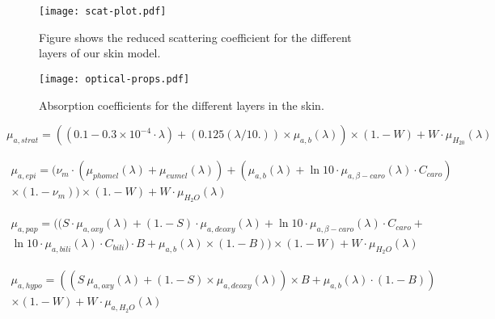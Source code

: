 \begin{figure}[!htpb]
	\centering
	\texttt{[image: scat-plot.pdf]}
	\caption{Figure shows the reduced scattering coefficient for the different layers of our skin model.}
	\label{fig:scatplot}
\end{figure}



\begin{figure}[!htpb]
  \centering
  \texttt{[image: optical-props.pdf]}
  \caption{Absorption coefficients for the different layers in the skin.}
  \label{fig:absoplayers}
\end{figure}


\begin{equation}
\mu_{a,strat}= ((0.1 - 0.3\times10^{-4}\cdot\lambda) + (0.125(\lambda/10.))\times \mu_{a,b}(\lambda))\times(1. - W) + W\cdot\mu_{H_20}(\lambda)
\label{eqn:stratabs}
\end{equation}

\begin{equation}
\begin{split}
\mu_{a,epi}= (\nu_m \cdot (\mu_{phomel}(\lambda) + \mu_{eumel}(\lambda)) + (\mu_{a,b}(\lambda) + \ln10 \cdot \mu_{a,\beta-caro}(\lambda) \cdot C_{caro}) \\ \times (1. - \nu_m)) \times(1. - W) + W \cdot \mu_{H_2O}(\lambda)
\end{split}
\label{eqn:epiabs}
\end{equation}

\begin{equation}
\begin{split}
\mu_{a,pap}=((S \cdot \mu_{a,oxy}(\lambda) + (1. - S) \cdot \mu_{a,deoxy}(\lambda) + \ln10 \cdot \mu_{a,\beta-caro}(\lambda) \cdot C_{caro} + \\ \ln10 \cdot \mu_{a,bili}(\lambda)\cdot C_{bili})\cdot B + \mu_{a,b}(\lambda) \times (1. - B)) \times (1. - W) + W \cdot \mu_{H_2O}(\lambda)
\end{split}
\label{eqn:dermisabs}
\end{equation}

\begin{equation}
\begin{split}
\mu_{a,hypo}=((S\  \mu_{a,oxy}(\lambda) + (1. - S) \times \mu_{a,deoxy}(\lambda)) \times B + \mu_{a,b}(\lambda) \cdot (1. - B))\\ \times (1. - W) + W \cdot \mu_{a,H_2O}(\lambda)
\end{split}
\label{eqn:hypoabs}
\end{equation}


